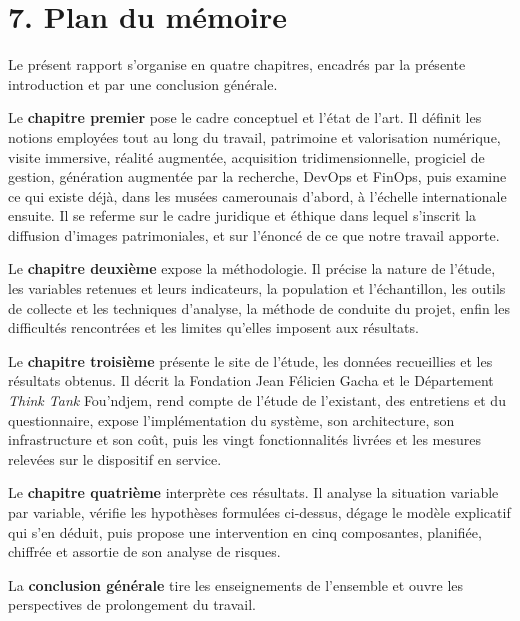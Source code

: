 \section*{7. Plan du mémoire}

Le présent rapport s'organise en quatre chapitres, encadrés par la présente
introduction et par une conclusion générale.

Le \textbf{chapitre premier} pose le cadre conceptuel et l'état de l'art. Il
définit les notions employées tout au long du travail, patrimoine et
valorisation numérique, visite immersive, réalité augmentée, acquisition
tridimensionnelle, progiciel de gestion, génération augmentée par la recherche,
DevOps et FinOps, puis examine ce qui existe déjà, dans les musées camerounais
d'abord, à l'échelle internationale ensuite. Il se referme sur le cadre
juridique et éthique dans lequel s'inscrit la diffusion d'images patrimoniales,
et sur l'énoncé de ce que notre travail apporte.

Le \textbf{chapitre deuxième} expose la méthodologie. Il précise la nature de
l'étude, les variables retenues et leurs indicateurs, la population et
l'échantillon, les outils de collecte et les techniques d'analyse, la méthode de
conduite du projet, enfin les difficultés rencontrées et les limites qu'elles
imposent aux résultats.

Le \textbf{chapitre troisième} présente le site de l'étude, les données
recueillies et les résultats obtenus. Il décrit la Fondation Jean Félicien Gacha
et le Département \emph{Think Tank} Fou'ndjem, rend compte de l'étude de
l'existant, des entretiens et du questionnaire, expose l'implémentation du
système, son architecture, son infrastructure et son coût, puis les vingt
fonctionnalités livrées et les mesures relevées sur le dispositif en service.

Le \textbf{chapitre quatrième} interprète ces résultats. Il analyse la situation
variable par variable, vérifie les hypothèses formulées ci-dessus, dégage le
modèle explicatif qui s'en déduit, puis propose une intervention en cinq
composantes, planifiée, chiffrée et assortie de son analyse de risques.

La \textbf{conclusion générale} tire les enseignements de l'ensemble et ouvre
les perspectives de prolongement du travail.
